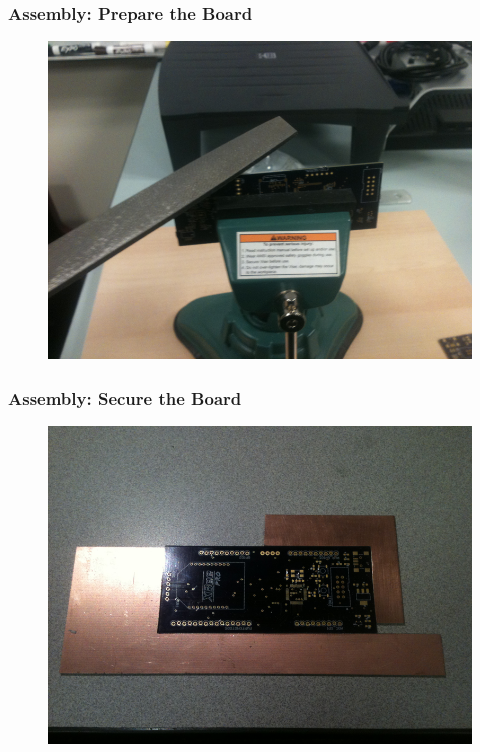 \documentclass{beamer}
\begin{document}

\begin{frame}
\frametitle{Assembly: Prepare the Board}
\begin{figure}
\includegraphics[width=0.8\linewidth]{assemble6.png}
\end{figure}
\end{frame}


\begin{frame}
\frametitle{Assembly: Secure the Board}
\begin{figure}
\includegraphics[width=0.8\linewidth]{assemble7.png}
\end{figure}
\end{frame}

\end{document}
